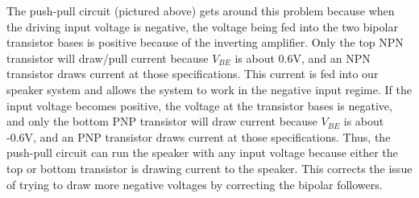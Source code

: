 \documentclass{article}
\begin{document}
    \indent The push-pull circuit (pictured above) gets around this problem because when the driving input voltage is negative, the voltage being fed into the two bipolar transistor bases is positive because of the inverting amplifier. Only the top NPN transistor will draw/pull current because $V_{BE}$ is about 0.6V, and an NPN transistor draws current at those specifications. This current is fed into our speaker system and allows the system to work in the negative input regime. If the input voltage becomes positive, the voltage at the transistor bases is negative, and only the bottom PNP transistor will draw current because $V_{BE}$ is about -0.6V, and an PNP transistor draws current at those specifications. Thus, the push-pull circuit can run the speaker with any input voltage because either the top or bottom transistor is drawing current to the speaker. This corrects the issue of trying to draw more negative voltages by correcting the bipolar followers.

\end{document}
